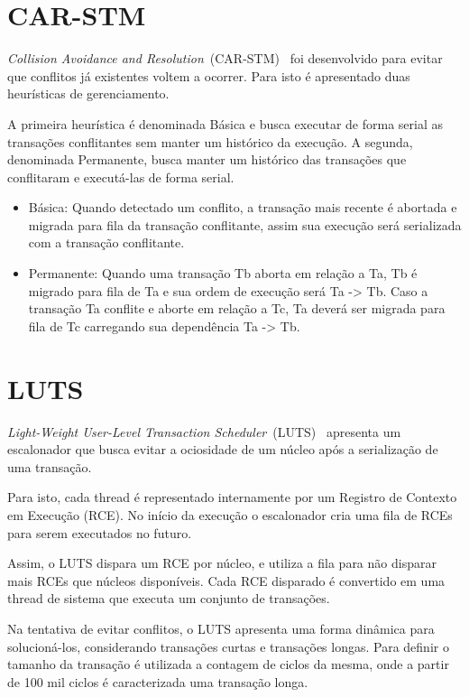 \documentclass[diss,capa]{texufpel}
\begin{document}
\section{CAR-STM}

\emph{Collision Avoidance and Resolution}~(CAR-STM)~\cite{carstm2008} foi desenvolvido para evitar que conflitos já existentes voltem a ocorrer. Para isto é apresentado duas heurísticas de gerenciamento.

A primeira heurística é denominada Básica e busca executar de forma serial as transações conflitantes sem manter um histórico da execução. A segunda, denominada Permanente, busca manter um histórico das transações que conflitaram e executá-las de forma serial.

\begin{itemize}
 \item Básica: Quando detectado um conflito, a transação mais recente é abortada e migrada para fila da transação conflitante, assim sua execução será serializada com a transação conflitante.
 \item Permanente: Quando uma transação Tb aborta em relação a Ta, Tb é migrado para fila de Ta e sua ordem de execução será Ta -> Tb. Caso a transação Ta conflite e aborte em relação a Tc, Ta deverá ser migrada para fila de Tc carregando sua dependência Ta -> Tb.
\end{itemize}

\section{LUTS}

\emph{Light-Weight User-Level Transaction Scheduler}~(LUTS)~\cite{Nicacio2012} apresenta um escalonador que busca evitar a ociosidade de um núcleo após a serialização de uma transação.

Para isto, cada thread é representado internamente por um Registro de Contexto em Execução (RCE). No início da execução o escalonador cria uma fila de RCEs para serem executados no futuro.

Assim, o LUTS dispara um RCE por núcleo, e utiliza a fila para não disparar mais RCEs que núcleos disponíveis. Cada RCE disparado é convertido em uma thread de sistema que executa um conjunto de transações.

Na tentativa de evitar conflitos, o LUTS apresenta uma forma dinâmica para solucioná-los, considerando transações curtas e transações longas. Para definir o tamanho da transação é utilizada a contagem de ciclos da mesma, onde a partir de 100 mil ciclos é caracterizada uma transação longa.
\end{document}
